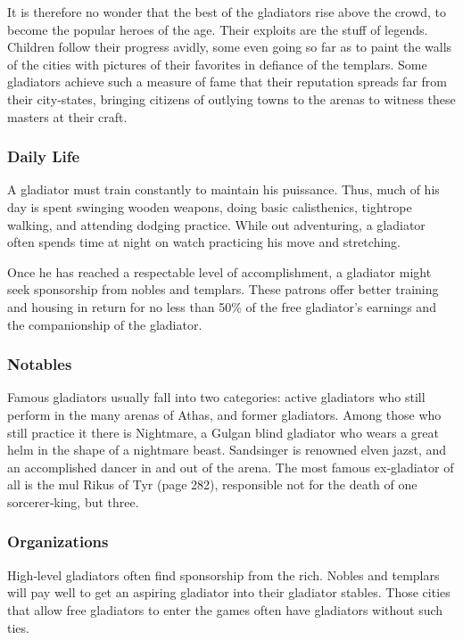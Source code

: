 It is therefore no wonder that the best of the gladiators rise above the crowd, to become the popular heroes of the age. Their exploits are the stuff of legends. Children follow their progress avidly, some even going so far as to paint the walls of the cities with pictures of their favorites in defiance of the templars. Some gladiators achieve such a measure of fame that their reputation spreads far from their city‐states, bringing citizens of outlying towns to the arenas to witness these masters at their craft.

\subsubsection{Daily Life}

A gladiator must train constantly to maintain his puissance. Thus, much of his day is spent swinging wooden weapons, doing basic calisthenics, tightrope walking, and attending dodging practice. While out adventuring, a gladiator often spends time at night on watch practicing his move and stretching.

Once he has reached a respectable level of accomplishment, a gladiator might seek sponsorship from nobles and templars. These patrons offer better training and housing in return for no less than 50\% of the free gladiator’s earnings and the companionship of the gladiator.

\subsubsection{Notables}

Famous gladiators usually fall into two categories: active gladiators who still perform in the many arenas of Athas, and former gladiators. Among those who still practice it there is Nightmare, a Gulgan blind gladiator who wears a great helm in the shape of a nightmare beast. Sandsinger is renowned elven jazst, and an accomplished dancer in and out of the arena. The most famous ex‐gladiator of all is the mul Rikus of Tyr (page 282), responsible not for the death of one sorcerer‐king, but three.

\subsubsection{Organizations}

High‐level gladiators often find sponsorship from the rich. Nobles and templars will pay well to get an aspiring gladiator into their gladiator stables. Those cities that allow free gladiators to enter the games often have gladiators without such ties.

